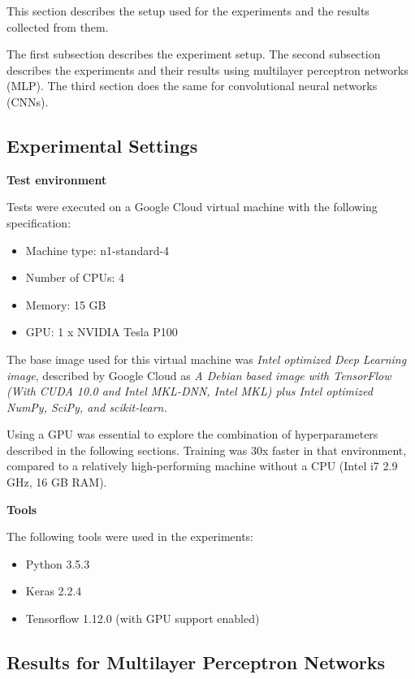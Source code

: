 \documentclass[../CAP6619_term_project_cgarbin.tex]{subfiles}
\begin{document}
This section describes the setup used for the experiments and the results collected from them.

The first subsection describes the experiment setup. The second subsection describes the experiments and their results using multilayer perceptron networks (MLP). The third section does the same for convolutional neural networks (CNNs).

\subsection{Experimental Settings}

\medskip
\textbf{Test environment}

Tests were executed on a Google Cloud virtual machine with the following specification:

\begin{itemize}
\item Machine type: n1-standard-4
\item Number of CPUs: 4
\item Memory: 15 GB
\item GPU: 1 x NVIDIA Tesla P100
\end{itemize}

The base image used for this virtual machine was \textit{Intel\textsuperscript{\textregistered} optimized Deep Learning image}, described by Google Cloud as \textit{A Debian based image with TensorFlow (With CUDA 10.0 and Intel\textsuperscript{\textregistered} MKL-DNN, Intel\textsuperscript{\textregistered} MKL) plus Intel\textsuperscript{\textregistered} optimized NumPy, SciPy, and scikit-learn.}

Using a GPU was essential to explore the combination of hyperparameters described in the following sections. Training was 30x faster in that environment, compared to a relatively high-performing machine without a CPU (Intel i7 2.9 GHz, 16 GB RAM).

\medskip
\textbf{Tools}

The following tools were used in the experiments:

\begin{itemize}
\item Python 3.5.3
\item Keras 2.2.4
\item Tensorflow 1.12.0 (with GPU support enabled)
\end{itemize}

\subsection{Results for Multilayer Perceptron Networks}
\end{document}
